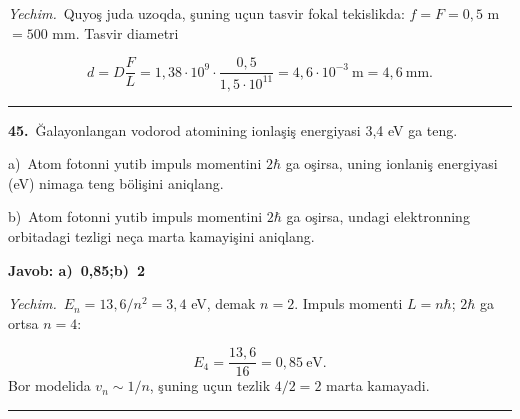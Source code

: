 \documentclass[11pt,a4paper]{article}
\begin{document}
\noindent\textit{Yechim.}\ Quyoş juda uzoqda, şuning uçun tasvir fokal tekislikda: $f=F=0{,}5$ m $=500$ mm. Tasvir diametri\par
\[d=D\frac{F}{L}=1{,}38\cdot10^9\cdot\frac{0{,}5}{1{,}5\cdot10^{11}}=4{,}6\cdot10^{-3}\ \text{m}=4{,}6\ \text{mm}.\]\par\medskip\hrule\medskip
{}\noindent\textbf{45.}\ Ğalayonlangan vodorod atomining ionlaşiş energiyasi 3,4 eV ga teng.\par
\noindent\hspace*{4mm}a)\ Atom fotonni yutib impuls momentini $2\hbar$ ga oşirsa, uning ionlaniş energiyasi (eV) nimaga teng bölişini aniqlang.\par
\noindent\hspace*{4mm}b)\ Atom fotonni yutib impuls momentini $2\hbar$ ga oşirsa, undagi elektronning orbitadagi tezligi neça marta kamayişini aniqlang.\par
\noindent\colorbox{gray!12}{\parbox{\dimexpr\linewidth-2\fboxsep}{\textbf{Javob: a)\ 0,85;\quad b)\ 2}}}\par\smallskip
\noindent\textit{Yechim.}\ $E_n=13{,}6/n^2=3{,}4$ eV, demak $n=2$. Impuls momenti $L=n\hbar$; $2\hbar$ ga ortsa $n=4$:\par
\[E_4=\frac{13{,}6}{16}=0{,}85\ \text{eV}.\]
Bor modelida $v_n\sim1/n$, şuning uçun tezlik $4/2=2$ marta kamayadi.\par\par\medskip\hrule\medskip
\end{document}
